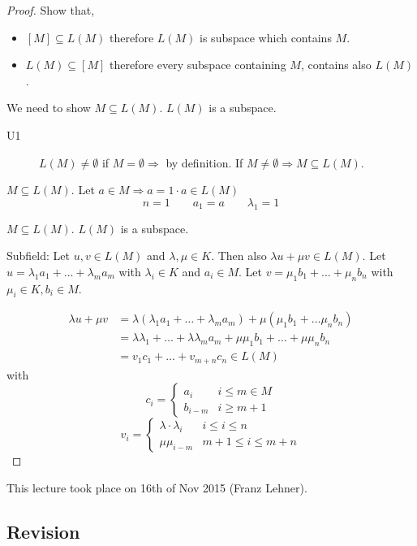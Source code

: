 \documentclass[a4paper,landscape,twocolumn]{article}
\newcommand\meta[3]{This #1 took place on #2 (#3).\par}
\begin{document}
\begin{proof}
  Show that,
  \begin{itemize}
    \item $[M] \subseteq L(M)$ therefore $L(M)$ is subspace which contains $M$.
    \item $L(M) \subseteq [M]$ therefore every subspace containing $M$, contains also $L(M)$.
  \end{itemize}

  We need to show $M \subseteq L(M)$.
  $L(M)$ is a subspace.
  \begin{description}
    \item[U1] $L(M) \neq \emptyset$
      if $M = \emptyset \Rightarrow$ by definition.
      If $M \neq \emptyset \Rightarrow M \subseteq L(M)$.
  \end{description}

  $M \subseteq L(M)$. Let $a \in M \Rightarrow a = 1 \cdot a \in L(M)$
  \[ n = 1 \qquad a_1 = a \qquad \lambda_1 = 1 \]


  $M \subseteq L(M)$.
  $L(M)$ is a subspace.


  Subfield:
  Let $u,v \in L(M)$ and $\lambda, \mu \in K$. Then also $\lambda u + \mu v \in L(M)$.
  Let $u = \lambda_1 a_1 + \ldots + \lambda_m a_m$ with $\lambda_i \in K$ and $a_i \in M$.
  Let $v = \mu_1 b_1 + \ldots + \mu_n b_n$ with $\mu_i \in K, b_i \in M$.

  \begin{align*}
      \lambda u + \mu v
        &= \lambda(\lambda_1 a_1 + \ldots + \lambda_m a_m) + \mu(\mu_1 b_1 + \ldots \mu_n b_n) \\
        &= \lambda \lambda_1 + \ldots + \lambda \lambda_m a_m + \mu \mu_1 b_1 + \ldots + \mu \mu_n b_n \\
        &= v_1 c_1 + \ldots + v_{m+n} c_n \in L(M)
  \end{align*}
  with
  \[
    c_i = \begin{cases}
      a_i & i \leq m \in M \\
      b_{i-m} & i \geq m + 1
    \end{cases}
  \] \[
    v_i = \begin{cases}
      \lambda \cdot \lambda_i & i \leq i \leq n \\
      \mu \mu_{i-m} & m + 1 \leq i \leq m+n
    \end{cases}
  \]
\end{proof}

\meta{lecture}{16th of Nov 2015}{Franz Lehner}

\subsection{Revision}
\end{document}
